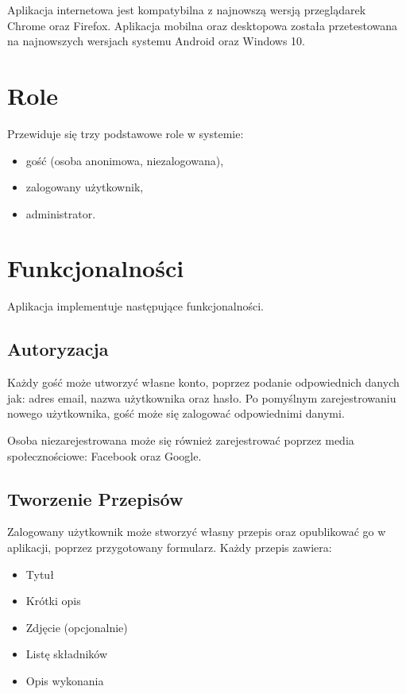 \documentclass[11pt]{article}
\begin{document}
  Aplikacja internetowa jest kompatybilna z najnowszą wersją przeglądarek Chrome oraz Firefox. Aplikacja mobilna oraz desktopowa została przetestowana na najnowszych wersjach systemu Android oraz Windows 10.  

  \section{Role}
  Przewiduje się trzy podstawowe role w systemie:

  \begin{itemize}
    \item gość (osoba anonimowa, niezalogowana),
    \item zalogowany użytkownik,
    \item administrator.
  \end{itemize}

  \section{Funkcjonalności}
  Aplikacja implementuje następujące funkcjonalności.

  \subsection{Autoryzacja}
  Każdy gość może utworzyć własne konto, poprzez podanie odpowiednich danych jak: adres email, nazwa użytkownika oraz hasło. Po pomyślnym zarejestrowaniu nowego użytkownika, gość może się zalogować odpowiednimi danymi.
  
  Osoba niezarejestrowana może się również zarejestrować poprzez media społecznościowe: Facebook oraz Google.
    
  \subsection{Tworzenie Przepisów}
  Zalogowany użytkownik może stworzyć własny przepis oraz opublikować go w aplikacji, poprzez przygotowany formularz.
  Każdy przepis zawiera:
  \begin{itemize}
      \item Tytuł
      \item Krótki opis
      \item Zdjęcie (opcjonalnie)
      \item Listę składników
      \item Opis wykonania
  \end{itemize}
\end{document}
